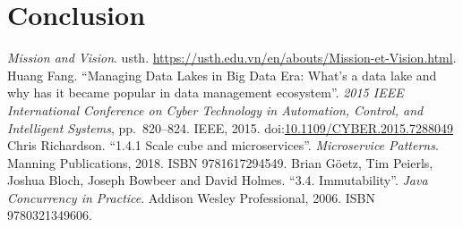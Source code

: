 \documentclass[a4paper,12pt]{book}
\newcommand{\doi}[1]{doi:\href{https://doi.org/#1}{#1}}
\begin{document}
\chapter{Conclusion}

\begin{appendices}
\printglossary[type=\acronymtype]

\begin{thebibliography}{69}
   \emph{Mission and Vision}.  \acrlong{usth}.
    \url{https://usth.edu.vn/en/abouts/Mission-et-Vision.html}.
   Huang Fang.
    ``Managing Data Lakes in Big Data Era: What's a data lake
    and why has it became popular in data management ecosystem''.
    \emph{2015 IEEE International Conference on Cyber Technology
    in Automation, Control, and Intelligent Systems}, pp.~820--824.
    IEEE, 2015.  \doi{10.1109/CYBER.2015.7288049}
   Chris Richardson.
    ``1.4.1 Scale cube and microservices''.  \emph{Microservice Patterns}.
    Manning Publications, 2018.  ISBN 9781617294549.
   Brian Göetz, Tim Peierls, Joshua Bloch,
    Joseph Bowbeer and David Holmes.
    ``3.4. Immutability''.  \emph{Java Concurrency in Practice}.
    Addison Wesley Professional, 2006.  ISBN 9780321349606.
\end{thebibliography}
\end{appendices}
\end{document}
